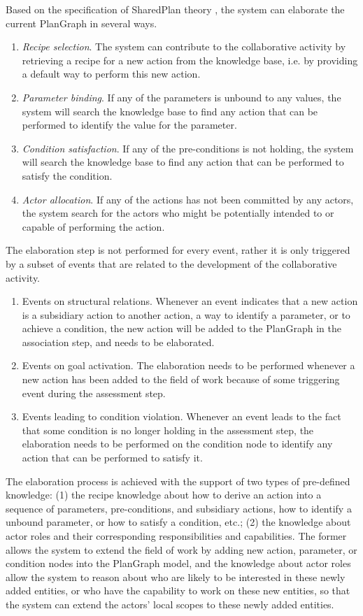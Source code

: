 Based on the specification of SharedPlan theory \cite{Grosz2006}, the system can elaborate the current PlanGraph in several ways. 
\begin{enumerate}
	\item \emph{Recipe selection}. The system can contribute to the collaborative activity by retrieving a recipe for a new action from the knowledge base, i.e. by providing a default way to perform this new action.
	\item \emph{Parameter binding}. If any of the parameters is unbound to any values, the system will search the knowledge base to find any action that can be performed to identify the value for the parameter.
	\item \emph{Condition satisfaction}. If any of the pre-conditions is not holding, the system will search the knowledge base to find any action that can be performed to satisfy the condition.
	\item \emph{Actor allocation}. If any of the actions has not been committed by any actors, the system search for the actors who might be potentially intended to or capable of performing the action. 
\end{enumerate}

The elaboration step is not performed for every event, rather it is only triggered by a subset of events that are related to the development of the collaborative activity. 
\begin{enumerate}
	\item Events on structural relations. Whenever an event indicates that a new action is a subsidiary action to another action, a way to identify a parameter, or to achieve a condition, the new action will be added to the PlanGraph in the association step, and needs to be elaborated.
	\item Events on goal activation. The elaboration needs to be performed whenever a new action has been added to the field of work because of some triggering event during the assessment step.
	\item Events leading to condition violation. Whenever an event leads to the fact that some condition is no longer holding in the assessment step, the elaboration needs to be performed on the condition node to identify any action that can be performed to satisfy it.
\end{enumerate}

The elaboration process is achieved with the support of two types of pre-defined knowledge: (1) the recipe knowledge about how to derive an action into a sequence of parameters, pre-conditions, and subsidiary actions, how to identify a unbound parameter, or how to satisfy a condition, etc.; (2) the knowledge about actor roles and their corresponding responsibilities and capabilities. The former allows the system to extend the field of work by adding new action, parameter, or condition nodes into the PlanGraph model, and the knowledge about actor roles allow the system to reason about who are likely to be interested in these newly added entities, or who have the capability to work on these new entities, so that the system can extend the actors' local scopes to these newly added entities.

